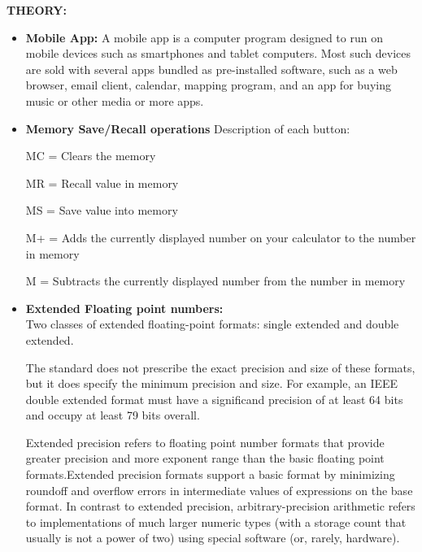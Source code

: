 \documentclass[a4paper,12pt]{article}
\begin{document}
\noindent \textbf{THEORY:}	\\
\begin{itemize}
\item \textbf{Mobile App:}
A mobile app is a computer program designed to run on mobile devices such as smartphones and tablet computers. Most such devices are sold with several apps bundled as pre-installed software, such as a web browser, email client, calendar, mapping program, and an app for buying music or other media or more apps. 
\end{itemize}
\begin{itemize}
\item \textbf{Memory Save/Recall operations}
    Description of each button:

    MC = Clears the memory

    MR = Recall value in memory

    MS = Save value into memory

    M+ = Adds the currently displayed number on your calculator to the  number in memory

    M = Subtracts the currently displayed number from the number in memory
\end{itemize}
\begin{itemize}
\item \textbf{Extended Floating point numbers:}\\
Two classes of extended floating-point formats: single extended and double extended.

The standard does not prescribe the exact precision and size of these formats, but it does specify the minimum precision and size. For example, an IEEE double extended format must have a significand precision of at least 64 bits and occupy at least 79 bits overall.

Extended precision refers to floating point number formats that provide greater precision and more exponent range than the basic floating point formats.Extended precision formats support a basic format by minimizing roundoff and overflow errors in intermediate values of expressions on the base format. In contrast to extended precision, arbitrary-precision arithmetic refers to implementations of much larger numeric types (with a storage count that usually is not a power of two) using special software (or, rarely, hardware).
\end{itemize}
\end{document}
